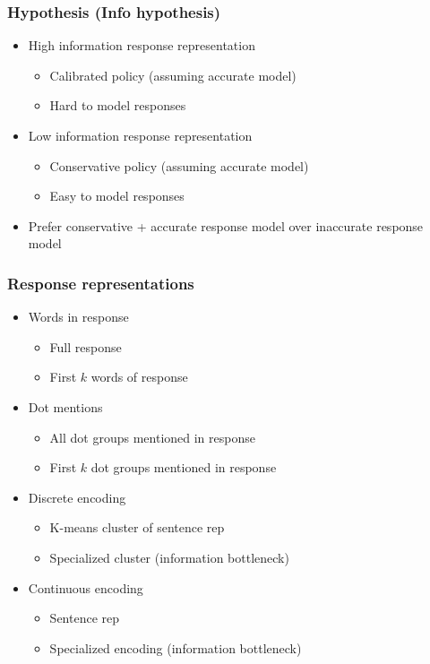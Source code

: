 \documentclass{beamer}
\begin{document}
\begin{frame}
\frametitle{Hypothesis (Info hypothesis)}
\begin{itemize}
\item High information response representation
    \begin{itemize}
    \item Calibrated policy (assuming accurate model)
    \item Hard to model responses
    \end{itemize}
\item Low information response representation
    \begin{itemize}
    \item Conservative policy (assuming accurate model)
    \item Easy to model responses
    \end{itemize}
\item Prefer conservative + accurate response model over
    inaccurate response model
\end{itemize}
\end{frame}

\begin{frame}
\frametitle{Response representations}
\begin{itemize}
\item Words in response
    \begin{itemize}
    \item Full response
    \item First $k$ words of response
    \end{itemize}
\item Dot mentions
    \begin{itemize}
    \item All dot groups mentioned in response
    \item First $k$ dot groups mentioned in response
    \end{itemize}
\item Discrete encoding
    \begin{itemize}
    \item K-means cluster of sentence rep
    \item Specialized cluster (information bottleneck)
    \end{itemize}
\item Continuous encoding
    \begin{itemize}
    \item Sentence rep
    \item Specialized encoding (information bottleneck)
    \end{itemize}
\end{itemize}
\end{frame}
\end{document}
